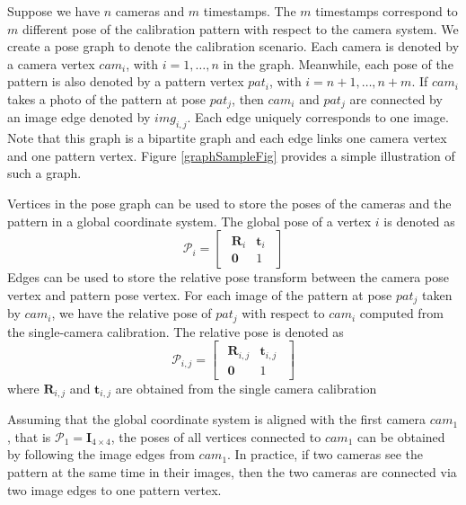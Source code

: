 \documentclass{report}
\begin{document}
Suppose we have $n$ cameras and $m$ timestamps. The $m$ timestamps correspond to $m$ different pose of the calibration pattern with respect to the camera system. We create a pose graph to denote the calibration scenario. Each camera is denoted by a camera vertex $cam_i$, with $i = 1, \dots, n$ in the graph. Meanwhile, each pose of the pattern is also denoted by a pattern vertex $pat_i$, with $i = n + 1, \dots, n + m$. If $cam_i$ takes a photo of the pattern at pose $pat_j$, then $cam_i$ and $pat_j$ are connected by an image edge denoted by $img_{i, j}$. Each edge uniquely corresponds to one image. Note that this graph is a bipartite graph and each edge links one camera vertex and one pattern vertex. Figure \ref{graphSampleFig} provides a simple illustration of such a graph. 

Vertices in the pose graph can be used to store the poses of the cameras and the pattern in a global coordinate system. The global pose of a vertex $i$ is denoted as 
\begin{equation}
\mathcal{P}_{i} = 
\begin{bmatrix}
	\begin{array}{cc}
	\mathbf{R}_{i} & \mathbf{t}_{i} \\ 
	\mathbf{0} & 1
	\end{array}
\end{bmatrix}
\end{equation}
Edges can be used to store the relative pose transform between the camera pose vertex and pattern pose vertex. For each image of the pattern at pose $pat_j$ taken by $cam_i$, we have the relative pose of $pat_j$ with respect to $cam_i$ computed from the single-camera calibration.  The relative pose is denoted as 
\begin{equation}
\mathcal{P}_{i, j} = 
\begin{bmatrix}
	\begin{array}{cc}
	\mathbf{R}_{i, j} & \mathbf{t}_{i, j} \\ 
	\mathbf{0} & 1
	\end{array}
\end{bmatrix}
\end{equation}
where $\mathbf{R}_{i, j}$ and $\mathbf{t}_{i, j}$ are obtained from the single camera calibration

Assuming that the global coordinate system is aligned with the first camera $cam_1$, that is $\mathcal{P}_1 = \mathbf{I}_{4\times4}$, the poses of all vertices connected to $cam_1$ can be obtained by following the image edges from $cam_1$. In practice, if two cameras see the pattern at the same time in their images, then the two cameras are connected via two image edges to one pattern vertex. 
\end{document}
